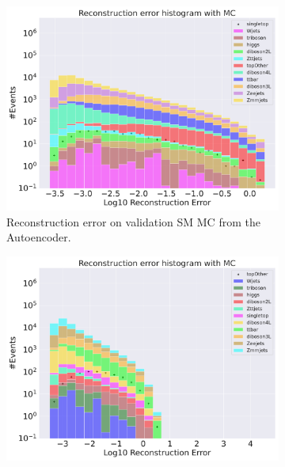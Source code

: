 \begin{figure}[h!]
    \centering
    \begin{subfigure}{.8\textwidth}
        \includegraphics[width=\textwidth]{Figures/AE_testing/big/b_data_recon_big_rm3_feats_sig_singletop.pdf}
        \caption{Reconstruction error on validation SM MC from the Autoencoder. }
        \label{fig:ae_big_singletop}
    \end{subfigure}
    \hfill
    \begin{subfigure}{.8\textwidth}
        \includegraphics[width=\textwidth]{Figures/AE_testing/big/b_data_recon_big_rm3_feats_sig_topOther.pdf}
        \caption{}
        \label{fig:ae_big_topOther}
    \end{subfigure}
    \hfill        
    \caption{ }
    \label{fig:ae_big_channel3}
\end{figure}



